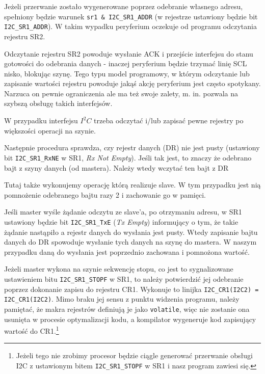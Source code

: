 Jeżeli przerwanie zostało wygenerowane poprzez odebranie własnego adresu, spełniony będzie warunek \Verb$sr1 & I2C_SR1_ADDR$ (w rejestrze ustawiony
będzie bit \Verb$I2C_SR1_ADDR$). W takim wypadku peryferium oczekuje od programu odczytania rejestru SR2.

\begin{ProTip}{}
Odczytanie rejestru SR2 powoduje wysłanie ACK i przejście interfejsu do stanu gotowości do odebrania danych - inaczej peryferium będzie
trzymać linię SCL nisko, blokując szynę. Tego typu model programowy, w którym odczytanie lub zapisanie wartości rejestru powoduje
jakąś akcję peryferium jest często spotykany. Narzuca on pewnie ograniczenia ale ma też swoje zalety, m. in. pozwala na szybszą obsługę takich
interfejsów.

W przypadku interfejsu $I^2C$ trzeba odczytać i/lub zapisać pewne rejestry po większości operacji na szynie.
\end{ProTip}

Następnie procedura sprawdza, czy rejestr danych (DR) nie jest pusty (ustawiony bit \Verb$I2C_SR1_RxNE$ w SR1, \textit{Rx Not Empty}).
Jeśli tak jest, to znaczy że odebrano bajt z szyny danych (od mastera). Należy wtedy wczytać ten bajt z DR

Tutaj także wykonujemy operację którą realizuje slave. W tym przypadku jest nią pomnożenie odebranego bajtu razy 2 i zachowanie go w pamięci.

Jeśli master wyśle żądanie odczytu ze slave'a, po otrzymaniu adresu, w SR1 ustawiony będzie bit \Verb$I2C_SR1_TxE$ (\textit{Tx Empty}) informujący
o tym, że takie żądanie nastąpiło a rejestr danych do wysłania jest pusty. Wtedy zapisanie bajtu danych do DR spowoduje wysłanie tych danych na szynę
do mastera. W naszym przypadku daną do wysłania jest poprzednio zachowana i pomnożona wartość.

Jeżeli master wykona na szynie sekwencję stopu, co jest to sygnalizowane ustawieniem bitu \Verb$I2C_SR1_STOPF$ w SR1,
to należy potwierdzić jej odebranie poprzez dokonanie zapisu do rejestru CR1.
Wykonuje to linijka \Verb$I2C_CR1(I2C2) = I2C_CR1(I2C2)$.
Mimo braku jej sensu z punktu widzenia programu, należy pamiętać, że makra rejestrów definiują je jako \texttt{volatile},
więc nie zostanie ona usunięta w procesie optymalizacji kodu, a kompilator wygeneruje kod zapisujący wartość do CR1.\footnote{
	Jeżeli tego nie zrobimy procesor będzie ciągle generować przerwanie obsługi I2C z ustawionym bitem \Verb$I2C_SR1_STOPF$ w SR1 i nasz program zawiesi się.
}

